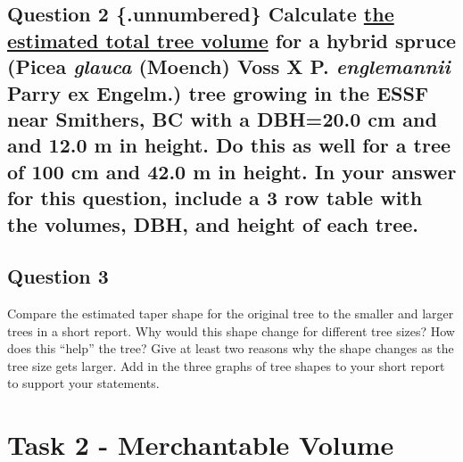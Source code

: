 \documentclass[
  letterpaper,
]{book}
\begin{document}
\hypertarget{question-2-.unnumbered-calculate-the-estimated-total-tree-volume-for-a-hybrid-spruce-picea-glauca-moench-voss-x-p.-englemannii-parry-ex-engelm.-tree-growing-in-the-essf-near-smithers-bc-with-a-dbh20.0-cm-and-and-12.0-m-in-height.-do-this-as-well-for-a-tree-of-100-cm-and-42.0-m-in-height.-in-your-answer-for-this-question-include-a-3-row-table-with-the-volumes-dbh-and-height-of-each-tree.}{%
\subsection{\texorpdfstring{Question 2 \{.unnumbered\} Calculate \ul{the
estimated total tree volume} for a hybrid spruce (Picea \emph{glauca}
(Moench) Voss X P. \emph{englemannii} Parry ex Engelm.) tree growing in
the ESSF near Smithers, BC with a DBH=20.0 cm and and 12.0 m in height.
Do this as well for a tree of 100 cm and 42.0 m in height. In your
answer for this question, include a 3 row table with the volumes, DBH,
and height of each
tree.}{Question 2 \{.unnumbered\} Calculate the estimated total tree volume for a hybrid spruce (Picea glauca (Moench) Voss X P. englemannii Parry ex Engelm.) tree growing in the ESSF near Smithers, BC with a DBH=20.0 cm and and 12.0 m in height. Do this as well for a tree of 100 cm and 42.0 m in height. In your answer for this question, include a 3 row table with the volumes, DBH, and height of each tree.}}\label{question-2-.unnumbered-calculate-the-estimated-total-tree-volume-for-a-hybrid-spruce-picea-glauca-moench-voss-x-p.-englemannii-parry-ex-engelm.-tree-growing-in-the-essf-near-smithers-bc-with-a-dbh20.0-cm-and-and-12.0-m-in-height.-do-this-as-well-for-a-tree-of-100-cm-and-42.0-m-in-height.-in-your-answer-for-this-question-include-a-3-row-table-with-the-volumes-dbh-and-height-of-each-tree.}}

\hypertarget{question-3-4}{%
\subsection*{Question 3}\label{question-3-4}}

Compare the estimated taper shape for the original tree to the smaller
and larger trees in a short report. Why would this shape change for
different tree sizes? How does this ``help'' the tree? Give at least two
reasons why the shape changes as the tree size gets larger. Add in the
three graphs of tree shapes to your short report to support your
statements.

\hypertarget{task-2---merchantable-volume}{%
\section*{Task 2 - Merchantable
Volume}\label{task-2---merchantable-volume}}
\end{document}
